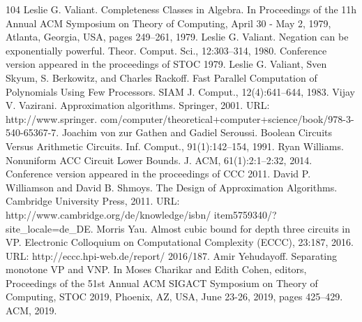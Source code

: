 \documentclass[10pt,a4paper]{article}
\begin{document}
\begin{thebibliography}{104}
 Leslie G. Valiant. Completeness Classes in Algebra. In Proceedings of the 11h Annual ACM Symposium on Theory of Computing, April 30 - May 2, 1979, Atlanta, Georgia, USA, pages 249–261, 1979.
 Leslie G. Valiant. Negation can be exponentially powerful. Theor. Comput. Sci., 12:303–314, 1980. Conference version appeared in the proceedings of STOC 1979.
 Leslie G. Valiant, Sven Skyum, S. Berkowitz, and Charles Rackoff. Fast Parallel Computation of Polynomials Using Few Processors. SIAM J. Comput., 12(4):641–644, 1983.
 Vijay V. Vazirani. Approximation algorithms. Springer, 2001. URL: http://www.springer. com/computer/theoretical+computer+science/book/978-3-540-65367-7.
 Joachim von zur Gathen and Gadiel Seroussi. Boolean Circuits Versus Arithmetic Circuits. Inf. Comput., 91(1):142–154, 1991.
 Ryan Williams. Nonuniform ACC Circuit Lower Bounds. J. ACM, 61(1):2:1–2:32, 2014. Conference version appeared in the proceedings of CCC 2011.
 David P. Williamson and David B. Shmoys. The Design of Approximation Algorithms. Cambridge University Press, 2011. URL: http://www.cambridge.org/de/knowledge/isbn/ item5759340/?site\_locale=de\_DE.
 Morris Yau. Almost cubic bound for depth three circuits in VP. Electronic Colloquium on Computational Complexity (ECCC), 23:187, 2016. URL: http://eccc.hpi-web.de/report/ 2016/187.
 Amir Yehudayoff. Separating monotone VP and VNP. In Moses Charikar and Edith Cohen, editors, Proceedings of the 51st Annual ACM SIGACT Symposium on Theory of Computing, STOC 2019, Phoenix, AZ, USA, June 23-26, 2019, pages 425–429. ACM, 2019.
\end{thebibliography}
\end{document}
